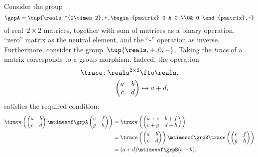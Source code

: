 \begin{example}
	Consider the group
	\begin{equation}
		\grpA=\tup{\reals^{2\times 2},+,\begin{pmatrix}
				0 & 0 \\0& 0
			\end{pmatrix},-}
	\end{equation} of real~$2\times 2$ matrices, together with sum of matrices as a binary operation, ``zero'' matrix as the neutral element, and the ``-'' operation as inverse.
	Furthermore, consider the group~$\tup{\reals,+,0,-}$.
	Taking the \emph{trace} of a matrix corresponds to a group morphism.
	Indeed, the operation
	\begin{equation*}
		\begin{aligned}
			\trace\colon \reals^{2\times 2} & \fto \reals, \\
			\begin{pmatrix}
				a & b \\
				c & d
			\end{pmatrix}     & \mapsto a+d,
		\end{aligned}
	\end{equation*}
	satisfies the required condition:
	\begin{equation*}
		\begin{aligned}
			\trace \left(
			\begin{pmatrix}
				a & b \\
				c & d
			\end{pmatrix} \mtimesof\grpA
			\begin{pmatrix}
				e & f \\
				g & h
			\end{pmatrix}
			\right) & =
			\trace
			\left(
			\begin{pmatrix}
				a+e & b+f \\
				c+g & d+h
			\end{pmatrix}
			\right)                               \\
			        & =\trace \left(
			\begin{pmatrix}
				a & b \\
				c & d
			\end{pmatrix}\right)\mtimesof\grpB \trace \left(
			\begin{pmatrix}
				e & f \\
				g & h
			\end{pmatrix}
			\right)                               \\
			        & =(a+d)\mtimesof\grpB (e+h).
		\end{aligned}
	\end{equation*}
\end{example}

